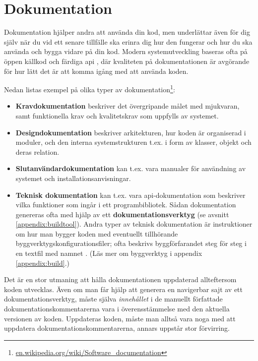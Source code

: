 
\chapter{Dokumentation}\label{appendix:doc}

Dokumentation hjälper andra att använda din kod, men underlättar även för dig själv när du vid ett senare tillfälle ska erinra dig hur den fungerar och hur du ska använda och bygga vidare på din kod. Modern systemutveckling baseras ofta på öppen källkod och färdiga api , där kvaliteten på dokumentationen är avgörande för hur lätt det är att komma igång med att använda koden.

Nedan listas exempel på olika typer av  dokumentation\footnote{\href{https://en.wikipedia.org/wiki/Software_documentation}{en.wikipedia.org/wiki/Software\_documentation}}:

\begin{itemize}
\item \textbf{Kravdokumentation} beskriver det övergripande målet med mjukvaran, samt funktionella krav och kvalitetskrav som uppfylls av systemet.
\item \textbf{Designdokumentation} beskriver arkitekturen, hur koden är organiserad i moduler, och den interna systemstrukturen t.ex. i form av klasser, objekt och deras relation.
\item \textbf{Slutanvändardokumentation} kan t.ex. vara manualer för användning av systemet och installationsanvisningar.
\item \textbf{Teknisk dokumentation} kan t.ex. vara api-dokumentation som beskriver vilka funktioner som ingår i ett programbibliotek. Sådan dokumentation genereras ofta med hjälp av ett \textbf{dokumentationsverktyg} (se avsnitt \ref{appendix:buildtool}).  Andra typer av teknisk dokumentation är instruktioner om hur man bygger koden med eventuellt tillhörande byggverktygskonfigurationsfiler; ofta beskrivs byggförfarandet steg för steg i en textfil med namnet . (Läs mer om byggverktyg i appendix \ref{appendix:build}.)
\end{itemize}

\noindent Det är en stor utmaning att hålla dokumentationen uppdaterad allteftersom koden utvecklas. Även om man får hjälp att generera en navigerbar sajt av ett dokumentationsverktyg, måste själva \textit{innehållet} i de manuellt författade dokumentationskommentarerna vara i överensstämmelse med den aktuella versionen av koden. Uppdateras koden, måste man alltså vara noga med att uppdatera dokumentationskommentarerna, annars uppstår stor förvirring.

